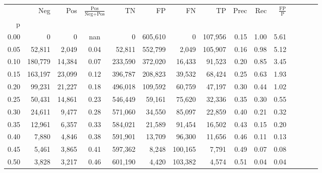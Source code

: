 \begin{tabular}{rrrcrrrrrrrrrrr}
\toprule
{} &      Neg &     Pos & $\frac{\text{Pos}}{\text{Neg}+\text{Pos}}$ &       TN &       FP &       FN &       TP &  Prec &   Rec & $\frac{\text{FP}}{\text{P}}$ \\
p    &          &         &                                            &          &          &          &          &       &       &                              \\
\midrule
0.00 &        0 &       0 &                                        nan &        0 &  605,610 &        0 &  107,956 &  0.15 &  1.00 &                         5.61 \\
0.05 &   52,811 &   2,049 &                                       0.04 &   52,811 &  552,799 &    2,049 &  105,907 &  0.16 &  0.98 &                         5.12 \\
0.10 &  180,779 &  14,384 &                                       0.07 &  233,590 &  372,020 &   16,433 &   91,523 &  0.20 &  0.85 &                         3.45 \\
0.15 &  163,197 &  23,099 &                                       0.12 &  396,787 &  208,823 &   39,532 &   68,424 &  0.25 &  0.63 &                         1.93 \\
0.20 &   99,231 &  21,227 &                                       0.18 &  496,018 &  109,592 &   60,759 &   47,197 &  0.30 &  0.44 &                         1.02 \\
0.25 &   50,431 &  14,861 &                                       0.23 &  546,449 &   59,161 &   75,620 &   32,336 &  0.35 &  0.30 &                         0.55 \\
0.30 &   24,611 &   9,477 &                                       0.28 &  571,060 &   34,550 &   85,097 &   22,859 &  0.40 &  0.21 &                         0.32 \\
0.35 &   12,961 &   6,357 &                                       0.33 &  584,021 &   21,589 &   91,454 &   16,502 &  0.43 &  0.15 &                         0.20 \\
0.40 &    7,880 &   4,846 &                                       0.38 &  591,901 &   13,709 &   96,300 &   11,656 &  0.46 &  0.11 &                         0.13 \\
0.45 &    5,461 &   3,865 &                                       0.41 &  597,362 &    8,248 &  100,165 &    7,791 &  0.49 &  0.07 &                         0.08 \\
0.50 &    3,828 &   3,217 &                                       0.46 &  601,190 &    4,420 &  103,382 &    4,574 &  0.51 &  0.04 &                         0.04 \\

\end{tabular}
